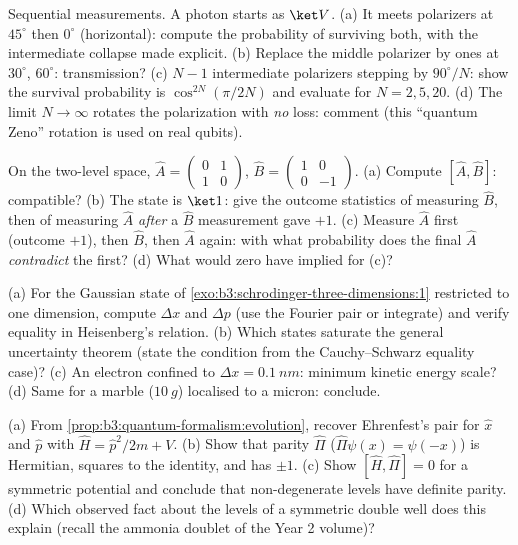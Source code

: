 \begin{exercise}[$\star\star$]\label{exo:b3:quantum-formalism:5}
Sequential measurements. A photon starts as $\ket V$. (a) It meets
polarizers at $45^\circ$ then $0^\circ$ (horizontal): compute the
probability of surviving both, with the intermediate collapse made
explicit. (b) Replace the middle polarizer by ones at $30^\circ$,
$60^\circ$: transmission? (c) $N - 1$ intermediate polarizers
stepping by $90^\circ/N$: show the survival probability is
$\cos^{2N}(\pi/2N)$ and evaluate for $N = 2, 5, 20$. (d) The limit
$N \to \infty$ rotates the polarization with \emph{no} loss:
comment (this ``quantum Zeno'' rotation is used on real qubits).
\end{exercise}

\begin{exercise}[$\star\star$]\label{exo:b3:quantum-formalism:6}
On the two-level space, $\hat A = \begin{pmatrix}0&1\\1&0
\end{pmatrix}$, $\hat B = \begin{pmatrix}1&0\\0&-1\end{pmatrix}$.
(a) Compute $[\hat A, \hat B]$: compatible? (b) The state is
$\ket1$: give the outcome statistics of measuring $\hat B$, then of
measuring $\hat A$ \emph{after} a $\hat B$ measurement gave $+1$.
(c) Measure $\hat A$ first (outcome $+1$), then $\hat B$, then
$\hat A$ again: with what probability does the final $\hat A$
\emph{contradict} the first? (d) What would zero  have
implied for (c)?
\end{exercise}

\begin{exercise}[$\star\star$]\label{exo:b3:quantum-formalism:7}
(a) For the Gaussian state of
\cref{exo:b3:schrodinger-three-dimensions:1} restricted to one
dimension, compute $\Delta x$ and $\Delta p$ (use the Fourier pair or
integrate) and verify equality in Heisenberg's relation. (b) Which
states saturate the general uncertainty theorem (state the condition
from the Cauchy--Schwarz equality case)? (c) An electron confined to
$\Delta x = \qty{0.1}{nm}$: minimum kinetic energy scale? (d) Same
for a marble ($\qty{10}{g}$) localised to a micron: conclude.
\end{exercise}

\begin{exercise}[$\star\star$]\label{exo:b3:quantum-formalism:8}
(a) From \cref{prop:b3:quantum-formalism:evolution}, recover
Ehrenfest's pair for $\hat x$ and $\hat p$ with $\hat H = \hat
p^2/2m + V$. (b) Show that parity $\hat\Pi$ ($\hat\Pi\psi(x) =
\psi(-x)$) is Hermitian, squares to the identity, and has
 $\pm1$. (c) Show $[\hat H, \hat\Pi] = 0$ for a symmetric
potential and conclude that non-degenerate levels have definite
parity. (d) Which observed fact about the levels of a symmetric
double well does this explain (recall the ammonia doublet of the
Year 2 volume)?
\end{exercise}

